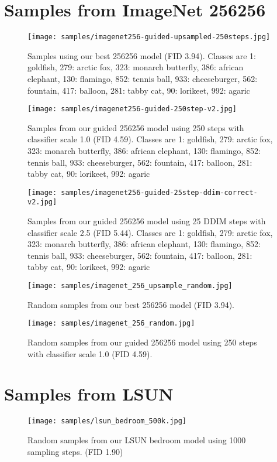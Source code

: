 \documentclass{article}
\begin{document}
\section{Samples from ImageNet \texorpdfstring{256256}{256x256}}
\begin{figure}[h]
    \centerline{\texttt{[image: samples/imagenet256-guided-upsampled-250steps.jpg]}}
    \caption{Samples using our best 256256 model (FID 3.94). Classes are 1: goldfish, 279: arctic fox, 323: monarch butterfly, 386: african elephant, 130: flamingo, 852: tennis ball, 933: cheeseburger, 562: fountain, 417: balloon, 281: tabby cat, 90: lorikeet, 992: agaric}
    \vskip -1in
\end{figure}
\clearpage
\begin{figure}[h]
    \centerline{\texttt{[image: samples/imagenet256-guided-250step-v2.jpg]}}
    \caption{Samples from our guided 256256 model using 250 steps with classifier scale 1.0 (FID 4.59). Classes are 1: goldfish, 279: arctic fox, 323: monarch butterfly, 386: african elephant, 130: flamingo, 852: tennis ball, 933: cheeseburger, 562: fountain, 417: balloon, 281: tabby cat, 90: lorikeet, 992: agaric}
\end{figure}
\clearpage
\begin{figure}[h]
    \centerline{\texttt{[image: samples/imagenet256-guided-25step-ddim-correct-v2.jpg]}}
    \caption{Samples from our guided 256256 model using 25 DDIM steps with classifier scale 2.5 (FID 5.44). Classes are 1: goldfish, 279: arctic fox, 323: monarch butterfly, 386: african elephant, 130: flamingo, 852: tennis ball, 933: cheeseburger, 562: fountain, 417: balloon, 281: tabby cat, 90: lorikeet, 992: agaric}
\end{figure}

\begin{figure}[h]
    \centerline{\texttt{[image: samples/imagenet\_256\_upsample\_random.jpg]}}
    \caption{Random samples from our best 256256 model (FID 3.94).}
    \vskip -1in
\end{figure}

\begin{figure}[h]
    \centerline{\texttt{[image: samples/imagenet\_256\_random.jpg]}}
    \caption{Random samples from our guided 256256 model using 250 steps with classifier scale 1.0 (FID 4.59).}
    \vskip -1in
\end{figure}

\clearpage
\section{Samples from LSUN}
\label{app:endfullsamples}
\begin{figure}[h]
    \centerline{\texttt{[image: samples/lsun\_bedroom\_500k.jpg]}}
    \caption{Random samples from our LSUN bedroom model using 1000 sampling steps. (FID 1.90)}
    \vskip -1in
\end{figure}
\end{document}
